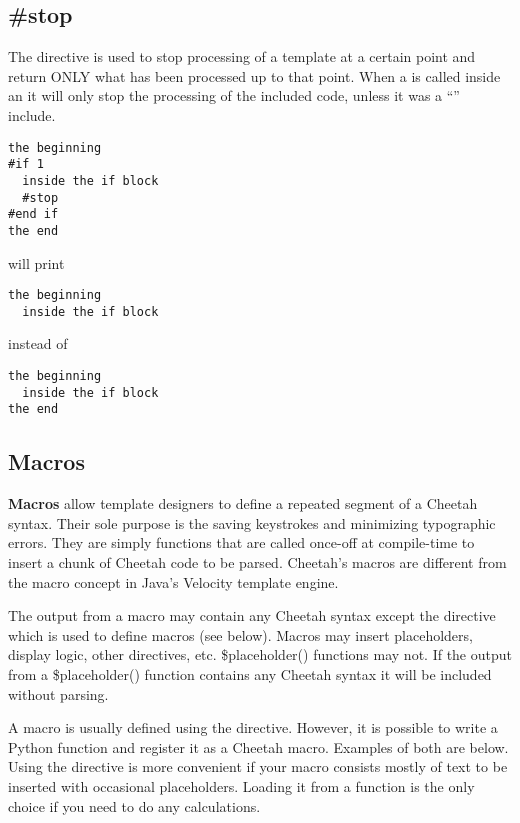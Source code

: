 \subsection{\#stop}
\label{directives.stop}

The  directive is used to stop processing of a template at a
certain point and return ONLY what has been processed up to that point.  When a
 is called inside an  it will only stop the
processing of the included code, unless it was a ``'' include.

\begin{verbatim}
the beginning
#if 1
  inside the if block
  #stop
#end if
the end
\end{verbatim}

will print 
\begin{verbatim}
the beginning
  inside the if block
\end{verbatim}

instead of 
\begin{verbatim}
the beginning
  inside the if block
the end
\end{verbatim}

\subsection{Macros}
\label{directives.macros}


{\bf Macros} allow template designers to define a repeated segment of a Cheetah
syntax.  Their sole purpose is the saving keystrokes and minimizing typographic
errors.  They are simply functions that are called once-off at compile-time to
insert a chunk of Cheetah code to be parsed.  Cheetah's macros are different
from the macro concept in Java's Velocity template engine.

The output from a macro may contain any Cheetah syntax except the 
directive which is used to define macros (see below).  Macros may insert
placeholders, display logic, other directives, etc.  \$placeholder() functions
may not.  If the output from a \$placeholder() function contains any Cheetah
syntax it will be included without parsing.

A macro is usually defined using the  directive.  However, it is
possible to write a Python function and register it as a Cheetah macro.
Examples of both are below.  Using the  directive is more
convenient if your macro consists mostly of text to be inserted with occasional
placeholders.  Loading it from a function is the only choice if you need to do
any calculations.


